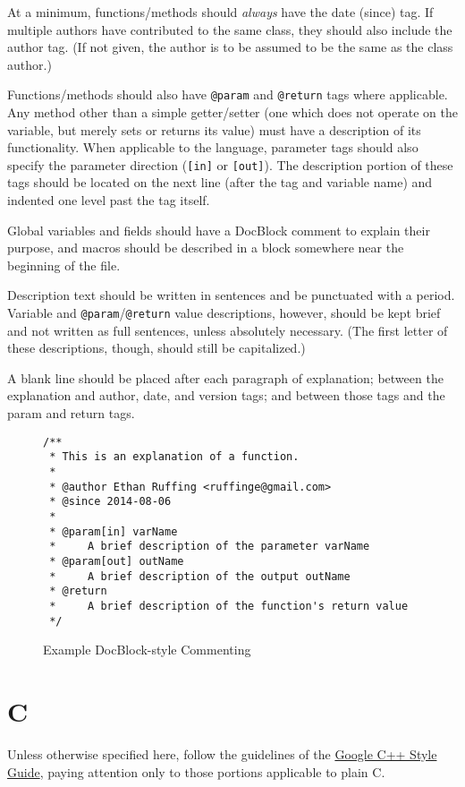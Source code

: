 \documentclass[12pt,letter]{memoir} %
\begin{document}
				At a minimum, functions/methods should \emph{always} have the
                date (since) tag. If multiple authors have contributed to the
                same class, they should also include the author tag. (If not
                given, the author is to be assumed to be the same as the
				class author.)

				Functions/methods should also have \texttt{@param} and
                \texttt{@return} tags where applicable.
				Any method other than a simple getter/setter (one which does not operate on the
				variable, but merely sets or returns its value) must have a description of its
				functionality. When applicable to the language, parameter tags should also
				specify the parameter direction (\texttt{[in]} or \texttt{[out]}). The description
				portion of these tags should be located on the next line (after the tag and variable
				name) and indented one level past the tag itself.

				Global variables and fields should have a DocBlock comment to explain their
				purpose, and macros should be described in a block somewhere near the
				beginning of the file.

				Description text should be written in sentences and be punctuated with a period.
				Variable and \texttt{@param}/\texttt{@return} value descriptions, however, should be kept
				brief and not written as full sentences, unless absolutely necessary. (The first
				letter of these descriptions, though, should still be capitalized.)

				A blank line should be placed after each paragraph of explanation; between the
				explanation and author, date, and version tags; and between those tags and the
				param and return tags.

				\begin{figure}[h!]
					\label{lst:docblock-functional}
					\caption{Example DocBlock-style Commenting}
					\lstset{language=C}
					\begin{lstlisting}
/**
 * This is an explanation of a function.
 *
 * @author Ethan Ruffing <ruffinge@gmail.com>
 * @since 2014-08-06
 *
 * @param[in] varName
 *     A brief description of the parameter varName
 * @param[out] outName
 *     A brief description of the output outName
 * @return
 *     A brief description of the function's return value
 */
					\end{lstlisting}
				\end{figure}
	\section{C}
		Unless otherwise specified here, follow the guidelines of the
		\href{http://google-styleguide.googlecode.com/svn/trunk/cppguide.xml}{Google C++ Style Guide},
		paying attention only to those portions applicable to plain C.
\end{document}
